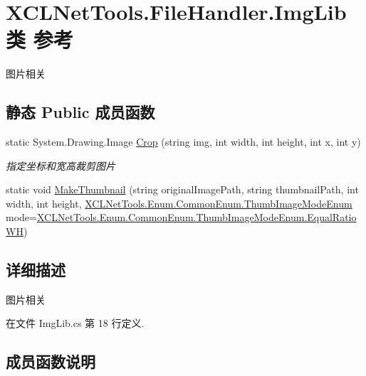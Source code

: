 \hypertarget{class_x_c_l_net_tools_1_1_file_handler_1_1_img_lib}{}\section{X\+C\+L\+Net\+Tools.\+File\+Handler.\+Img\+Lib类 参考}
\label{class_x_c_l_net_tools_1_1_file_handler_1_1_img_lib}


图片相关  


\subsection*{静态 Public 成员函数}
\begin{DoxyCompactItemize}
\item 
static System.\+Drawing.\+Image \hyperlink{class_x_c_l_net_tools_1_1_file_handler_1_1_img_lib_ad00cc641f4f1585d61ce6c86962a6213}{Crop} (string img, int width, int height, int x, int y)
\begin{DoxyCompactList}\small\item\em 指定坐标和宽高裁剪图片 \end{DoxyCompactList}\item 
static void \hyperlink{class_x_c_l_net_tools_1_1_file_handler_1_1_img_lib_ab5403c4363f26a72cc0b98a4e86d5fa1}{Make\+Thumbnail} (string original\+Image\+Path, string thumbnail\+Path, int width, int height, \hyperlink{class_x_c_l_net_tools_1_1_enum_1_1_common_enum_abb6d9d6cd508fc9ced27b814afb38974}{X\+C\+L\+Net\+Tools.\+Enum.\+Common\+Enum.\+Thumb\+Image\+Mode\+Enum} mode=\hyperlink{class_x_c_l_net_tools_1_1_enum_1_1_common_enum_abb6d9d6cd508fc9ced27b814afb38974ad2346d2aff378b001c28eaa423ca1a3a}{X\+C\+L\+Net\+Tools.\+Enum.\+Common\+Enum.\+Thumb\+Image\+Mode\+Enum.\+Equal\+Ratio\+WH})
\end{DoxyCompactItemize}


\subsection{详细描述}
图片相关 



在文件 Img\+Lib.\+cs 第 18 行定义.



\subsection{成员函数说明}
